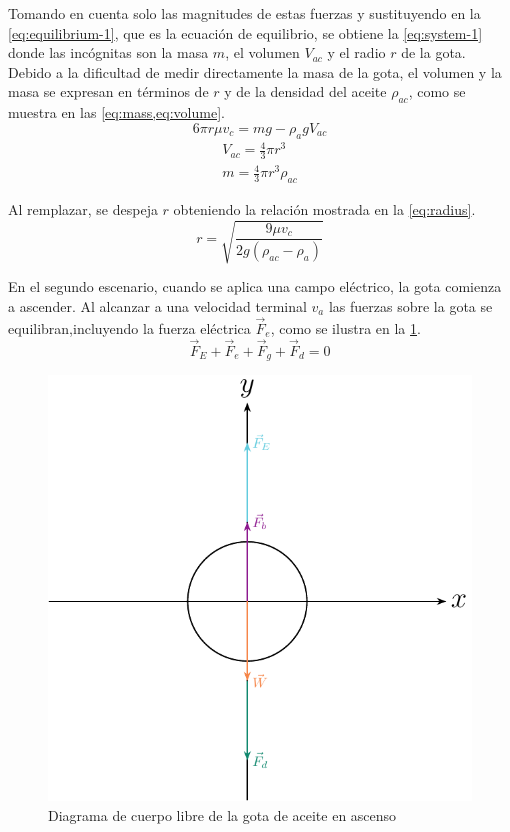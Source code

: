 Tomando en cuenta solo las magnitudes de estas fuerzas y sustituyendo en la
\cref{eq:equilibrium-1}, que es la ecuación de equilibrio, se obtiene la
\cref{eq:system-1} donde las incógnitas son la masa \(m\), el volumen
\(V_{ac}\) y el radio \(r\) de la gota.
Debido a la dificultad de medir directamente la masa de la gota, el volumen y la
masa se expresan en términos de \(r\) y de la densidad del aceite \(\rho_{ac}\),
como se muestra en las \cref{eq:mass,eq:volume}.
\begin{equation}\label{eq:system-1}
    6\pi r\mu v_c = mg - \rho_a g V_{ac}
\end{equation}
\begin{align}
    V_{ac} = \frac{4}{3}\pi r^3 \label{eq:volume} \\
    m = \frac{4}{3}\pi r^3\rho_{ac} \label{eq:mass}
\end{align}

Al remplazar, se despeja \( r \) obteniendo la relación mostrada en la
\cref{eq:radius}.
\begin{equation}\label{eq:radius}
    r = \sqrt{\frac{9\mu v_c}{2g(\rho_{ac}-\rho_a)}}
\end{equation}

En el segundo escenario, cuando se aplica una campo eléctrico, la gota comienza
a ascender.
Al alcanzar a una velocidad terminal $v_a$ las fuerzas sobre la gota se
equilibran,incluyendo la fuerza eléctrica \(\vec{F}_e\), como se ilustra en la
\cref{fig:fbd-ascending-drop}.
\begin{equation}
    \vec{F}_E + \vec{F}_e + \vec{F}_g + \vec{F}_d = 0
\end{equation}

\begin{figure}[htbp!]
    \centering
    \includegraphics[width=0.8\linewidth]{./images/free-body-diagram-ascending.pdf}
    \caption{Diagrama de cuerpo libre de la gota de aceite en ascenso}
    \label{fig:fbd-ascending-drop}
\end{figure}


